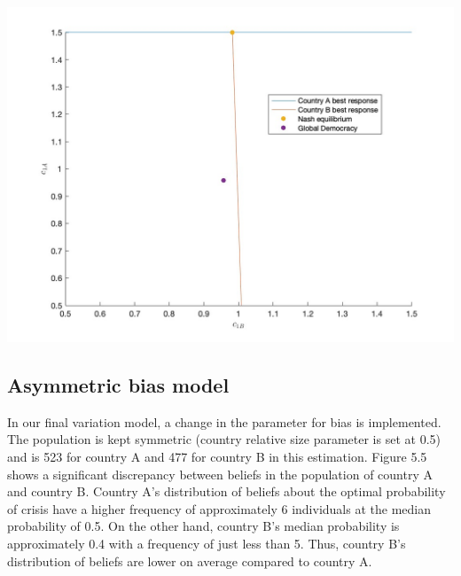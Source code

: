 \documentclass[11pt,preprint, authoryear]{elsarticle}
\let\origfigure\figure
\let\endorigfigure\endfigure
\renewenvironment{figure}[1][2] {
    \expandafter\origfigure\expandafter[H]
} {
    \endorigfigure
}
\numberwithin{equation}{section}
\numberwithin{figure}{section}
\numberwithin{table}{section}
\begin{document}
\begin{figure}[H]

{\centering \includegraphics[width=0.8\linewidth]{images/Fig2_0.1Size0Bias} 

}

\caption{Best response functions for asymmetric country size model}\label{fig:Fig 5.4}
\end{figure}

\hypertarget{asymmetric-bias-model}{%
\subsection{Asymmetric bias model}\label{asymmetric-bias-model}}

In our final variation model, a change in the parameter for bias is
implemented. The population is kept symmetric (country relative size
parameter is set at 0.5) and is 523 for country A and 477 for country B
in this estimation. Figure 5.5 shows a significant discrepancy between
beliefs in the population of country A and country B. Country A's
distribution of beliefs about the optimal probability of crisis have a
higher frequency of approximately 6 individuals at the median
probability of 0.5. On the other hand, country B's median probability is
approximately 0.4 with a frequency of just less than 5. Thus, country
B's distribution of beliefs are lower on average compared to country A.
\end{document}
